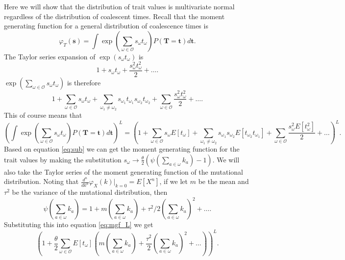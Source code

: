 Here we will show that the distribution of trait values is multivariate normal
regardless of the distribution of coalescent times. Recall that the moment
generating function for a general distribution of coalescence times is
\begin{equation}
  \varphi_T(\mathbf{s}) = \int \exp \left( \sum_{\omega \in \mathcal{O}} s_{\omega}t_{\omega} \right)
  P(\mathbf{T}=\mathbf{t})d\mathbf{t}.
\end{equation}
The Taylor series expansion of $\exp \left( s_{\omega}t_{\omega} \right)$ is
\begin{equation}
  1 + s_{\omega}t_{\omega} + \frac{s_{\omega}^2t_{\omega}^2}{2} + \ldots. \nonumber
\end{equation}
$\exp \left( \sum_{\omega \in \mathcal{O}} s_{\omega}t_{\omega} \right)$ is therefore
\begin{equation}
  1 + \sum_{\omega \in \mathcal{O}} s_{\omega}t_{\omega} +
  \sum_{\omega_1 \neq \omega_2} s_{\omega_1}t_{\omega_1}s_{\omega_2}t_{\omega_2} + 
  \sum_{\omega \in \mathcal{O}} \frac{s_{\omega}^2t_{\omega}^2}{2} + \ldots. \nonumber
\end{equation}
This of course means that
\begin{equation}
  \label{eq:mgf_L}
  \left(\int \exp \left( \sum_{\omega \in \mathcal{O}} s_{\omega}t_{\omega}
  \right)P(\mathbf{T}=\mathbf{t})d\mathbf{t}\right)^L = \left(1 + \sum_{\omega \in \mathcal{O}}
  s_{\omega}E[t_{\omega}] + \sum_{\omega_1 \neq \omega_2}
  s_{\omega_1}s_{\omega_2}E[t_{\omega_2}t_{\omega_1}] + \sum_{\omega \in
    \mathcal{O}} \frac{s_{\omega}^2E[t_{\omega}^2]}{2} + \ldots\right)^L. 
\end{equation}
Based on equation \ref{eq:sub} we can get the moment generating function for the
trait values by making the substitution $s_{\omega}\to \frac{\theta}{2} \left(
\psi\left(\sum_{a \in \omega}k_{a}\right) -1 \right)$. We will also take the
Taylor series of the moment generating function of the mutational distribution.
Noting that $\frac{d^n}{dk^n}\varphi_X(k)\Bigr|_{k=0} = E[X^n]$, if we let $m$
be the mean and $\tau^2$ be the variance of the mutational distribution, then
\begin{equation}
  \psi\left( \sum_{a \in \omega} k_a \right) = 1 + m \left( \sum_{a \in \omega}
  k_a\right) + \tau^2/2\left( \sum_{a \in \omega} k_a\right)^2 + \ldots.
  \nonumber
\end{equation}
Substituting this into equation \ref{eq:mgf_L} we get
\begin{equation}
  \left( 1 + \frac{\theta}{2} \sum_{\omega \in \mathcal{O}} E[t_{\omega}]\left( m \left(
  \sum_{a \in \omega} k_a\right) + \frac{\tau^2}{2}\left( \sum_{a \in \omega}
  k_a\right)^2 + \ldots\right)\right)^L.
\end{equation}
